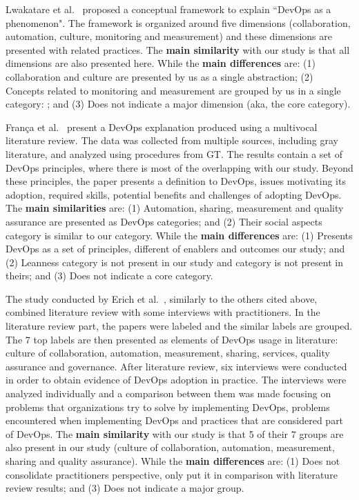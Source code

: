 Lwakatare et al.~\cite{extending_dimensions_icsea_16} proposed a conceptual
framework to explain ``DevOps as a phenomenon". The framework is organized around
five dimensions (collaboration, automation, culture, monitoring and measurement)
and these dimensions are presented with related practices. The \textbf{main similarity}
with our study is that all dimensions are also presented here. While the
\textbf{main differences} are: (1) collaboration and culture are presented by us
as a single abstraction; (2) Concepts related to monitoring and measurement are
grouped by us in a single category: ; and (3) Does
not indicate a major dimension (aka, the core category).

Fran\c{c}a et al.~\cite{characterizing_devops_sbes_2016} present a DevOps
explanation produced using a multivocal literature review. The data was collected
from multiple sources, including gray literature, and analyzed using procedures
from GT. The results contain a set of DevOps principles, where
there is most of the overlapping with our study. Beyond these principles, the paper
presents a definition to DevOps, issues motivating its adoption, required skills,
potential benefits and challenges of adopting DevOps. The \textbf{main similarities}
are: (1) Automation, sharing, measurement and quality assurance are presented as
DevOps categories; and (2) Their social aspects category is similar to our
\cc category. While the \textbf{main differences} are: (1) Presents DevOps as a
set of principles, different of enablers and outcomes our study; and (2) Leanness
category is not present in our study and  category is not present
in theirs; and (3) Does not indicate a core category.

The study conducted by Erich et al.~\cite{qualitative_devops_journalsw_17},
similarly to the others cited above, combined literature review with some
interviews with practitioners. In the literature review part, the papers were
labeled and the similar labels are grouped. The 7 top labels are then presented
as elements of DevOps usage in literature: culture of collaboration, automation,
measurement, sharing, services, quality assurance and governance. After literature
review, six interviews were conducted in order to obtain evidence of DevOps
adoption in practice. The interviews were analyzed individually and a comparison
between them was made focusing on problems that organizations try to solve by
implementing DevOps, problems encountered when implementing DevOps and practices
that are considered part of DevOps. The \textbf{main similarity} with our study
is that 5 of their 7 groups are also present in our study (culture of collaboration,
automation, measurement, sharing and quality assurance). While the \textbf{main
differences} are: (1) Does not consolidate practitioners perspective, only put it
in comparison with literature review results; and (3) Does not indicate a major group.

